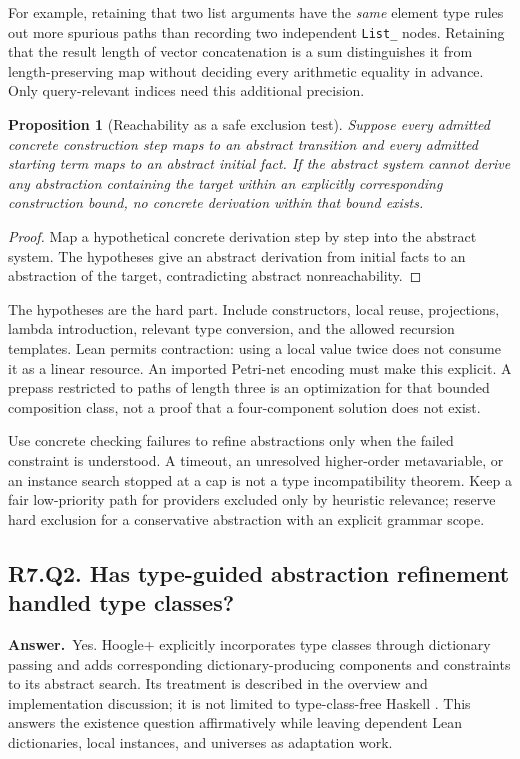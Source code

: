 \documentclass[11pt,a4paper]{article}
\newtheorem{proposition}[theorem]{Proposition}
\theoremstyle{definition}
\theoremstyle{remark}
\newcommand{\code}[1]{\texttt{#1}}
\newcommand{\answer}{\par\noindent\textbf{Answer.}\ }
\newcommand{\qheading}[2]{\subsection{#1. #2}}
\begin{document}
For example, retaining that two list arguments have the \emph{same} element
type rules out more spurious paths than recording two independent
\code{List\_} nodes. Retaining that the result length of vector concatenation
is a sum distinguishes it from length-preserving map without deciding every
arithmetic equality in advance. Only query-relevant indices need this
additional precision.

\begin{proposition}[Reachability as a safe exclusion test]
Suppose every admitted concrete construction step maps to an abstract
transition and every admitted starting term maps to an abstract initial fact.
If the abstract system cannot derive any abstraction containing the target
within an explicitly corresponding construction bound, no concrete derivation
within that bound exists.
\end{proposition}
\begin{proof}
Map a hypothetical concrete derivation step by step into the abstract system.
The hypotheses give an abstract derivation from initial facts to an abstraction
of the target, contradicting abstract nonreachability.
\end{proof}

The hypotheses are the hard part. Include constructors, local reuse,
projections, lambda introduction, relevant type conversion, and the allowed
recursion templates. Lean permits contraction: using a local value twice does
not consume it as a linear resource. An imported Petri-net encoding must make
this explicit. A prepass restricted to paths of length three is an optimization
for that bounded composition class, not a proof that a four-component solution
does not exist.

Use concrete checking failures to refine abstractions only when the failed
constraint is understood. A timeout, an unresolved higher-order metavariable,
or an instance search stopped at a cap is not a type incompatibility theorem.
Keep a fair low-priority path for providers excluded only by heuristic relevance;
reserve hard exclusion for a conservative abstraction with an explicit grammar
scope.

\qheading{R7.Q2}{Has type-guided abstraction refinement handled type classes?}
\answer Yes. Hoogle+ explicitly incorporates type classes through dictionary
passing and adds corresponding dictionary-producing components and constraints
to its abstract search. Its treatment is described in the overview and
implementation discussion; it is not limited to type-class-free Haskell
\cite{hoogle}. This answers the existence question affirmatively while leaving
dependent Lean dictionaries, local instances, and universes as adaptation work.
\end{document}
